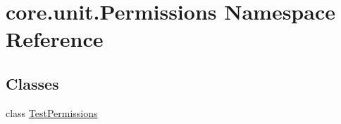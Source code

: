 \hypertarget{namespacecore_1_1unit_1_1Permissions}{\section{core.\-unit.\-Permissions Namespace Reference}
\label{namespacecore_1_1unit_1_1Permissions}
}
\subsection*{Classes}
\begin{DoxyCompactItemize}
\item 
class \hyperlink{classcore_1_1unit_1_1Permissions_1_1TestPermissions}{Test\-Permissions}
\end{DoxyCompactItemize}
